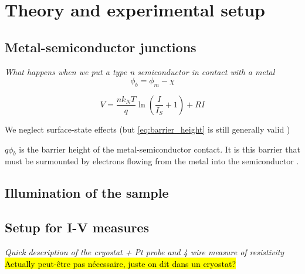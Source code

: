 \section{Theory and experimental setup}
\subsection{Metal-semiconductor junctions}
\emph{What happens when we put a type n semiconductor in contact with a metal}
\begin{equation} \label{eq:barrier_height}
    \phi_b = \phi_m - \chi
\end{equation}

\begin{equation} \label{eq:IV-curve}
    V = \frac{n k_N T}{q} \ln \left( \frac{I}{I_S} +1 \right) + RI
\end{equation}

We neglect surface-state effects (but \autoref{eq:barrier_height} is still generally valid \cite{sze_physics_2007})

$q \phi_b$ is the barrier height of the metal-semiconductor contact.
It is this barrier that must be surmounted by electrons flowing from the metal into the semiconductor \cite{sze_physics_2007}.

\subsection{Illumination of the sample}


\subsection{Setup for I-V measures}
\emph{Quick description of the cryostat + Pt probe and 4 wire measure of resistivity}
\hl{Actually peut-être pas nécessaire, juste on dit dans un cryostat?}
